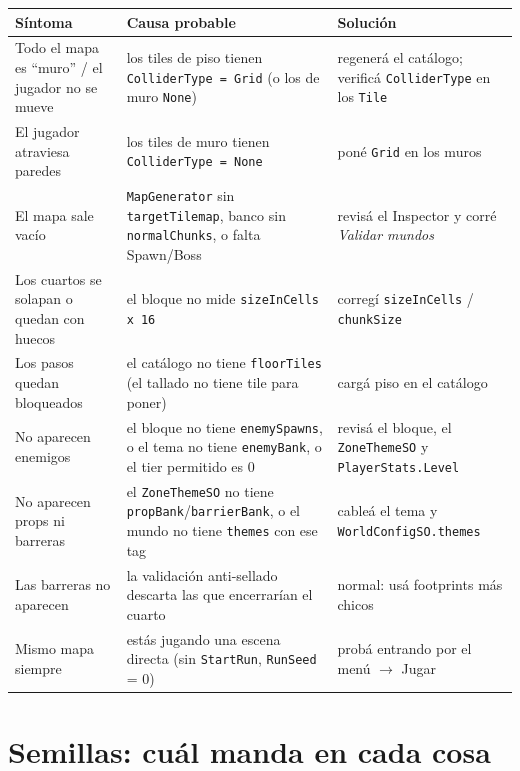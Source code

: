 \documentclass[11pt,a4paper]{article}
\newcommand{\code}[1]{\texttt{#1}}
\begin{document}
\small
\begin{longtable}{@{}p{4.6cm}p{5.2cm}p{4.6cm}@{}}
\toprule
\textbf{Síntoma} & \textbf{Causa probable} & \textbf{Solución} \\
\midrule
\endhead
Todo el mapa es ``muro'' / el jugador no se mueve & los tiles de piso tienen \code{ColliderType = Grid} (o los de muro \code{None}) & regenerá el catálogo; verificá \code{ColliderType} en los \code{Tile} \\
El jugador atraviesa paredes & los tiles de muro tienen \code{ColliderType = None} & poné \code{Grid} en los muros \\
El mapa sale vacío & \code{MapGenerator} sin \code{targetTilemap}, banco sin \code{normalChunks}, o falta Spawn/Boss & revisá el Inspector y corré \emph{Validar mundos} \\
Los cuartos se solapan o quedan con huecos & el bloque no mide \code{sizeInCells x 16} & corregí \code{sizeInCells} / \code{chunkSize} \\
Los pasos quedan bloqueados & el catálogo no tiene \code{floorTiles} (el tallado no tiene tile para poner) & cargá piso en el catálogo \\
No aparecen enemigos & el bloque no tiene \code{enemySpawns}, o el tema no tiene \code{enemyBank}, o el tier permitido es 0 & revisá el bloque, el \code{ZoneThemeSO} y \code{PlayerStats.Level} \\
No aparecen props ni barreras & el \code{ZoneThemeSO} no tiene \code{propBank}/\code{barrierBank}, o el mundo no tiene \code{themes} con ese tag & cableá el tema y \code{WorldConfigSO.themes} \\
Las barreras no aparecen & la validación anti-sellado descarta las que encerrarían el cuarto & normal: usá footprints más chicos \\
Mismo mapa siempre & estás jugando una escena directa (sin \code{StartRun}, \code{RunSeed} = 0) & probá entrando por el menú $\rightarrow$ Jugar \\
\bottomrule
\end{longtable}
\normalsize

\section{Semillas: cuál manda en cada cosa}
\end{document}
